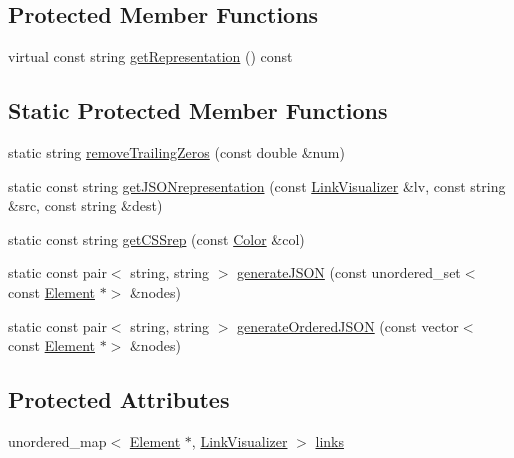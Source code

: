 \subsection*{Protected Member Functions}
\begin{DoxyCompactItemize}
\item 
virtual const string \hyperlink{classbridges_1_1_element_aab9638d19b612b69db1b96d0dbf39482}{get\+Representation} () const
\end{DoxyCompactItemize}
\subsection*{Static Protected Member Functions}
\begin{DoxyCompactItemize}
\item 
static string \hyperlink{classbridges_1_1_element_a0b905a076a71771a20ee4fb0ec858cfa}{remove\+Trailing\+Zeros} (const double \&num)
\item 
static const string \hyperlink{classbridges_1_1_element_a89d57f5de9663d23e6e2a7aa82d1d1bc}{get\+J\+S\+O\+Nrepresentation} (const \hyperlink{classbridges_1_1_link_visualizer}{Link\+Visualizer} \&lv, const string \&src, const string \&dest)
\item 
static const string \hyperlink{classbridges_1_1_element_afdff7e2e492144055bf532a73a28b9b1}{get\+C\+S\+Srep} (const \hyperlink{classbridges_1_1_color}{Color} \&col)
\item 
static const pair$<$ string, string $>$ \hyperlink{classbridges_1_1_element_ab1213565f8b6fa9a62a101d507ff5127}{generate\+J\+S\+ON} (const unordered\+\_\+set$<$ const \hyperlink{classbridges_1_1_element}{Element} $\ast$$>$ \&nodes)
\item 
static const pair$<$ string, string $>$ \hyperlink{classbridges_1_1_element_aac0166f66a2d9e551ba318e088649d0b}{generate\+Ordered\+J\+S\+ON} (const vector$<$ const \hyperlink{classbridges_1_1_element}{Element} $\ast$$>$ \&nodes)
\end{DoxyCompactItemize}
\subsection*{Protected Attributes}
\begin{DoxyCompactItemize}
\item 
unordered\+\_\+map$<$ \hyperlink{classbridges_1_1_element}{Element} $\ast$, \hyperlink{classbridges_1_1_link_visualizer}{Link\+Visualizer} $>$ \hyperlink{classbridges_1_1_element_a6fb53728edc378f26238543b26238496}{links}
\end{DoxyCompactItemize}
